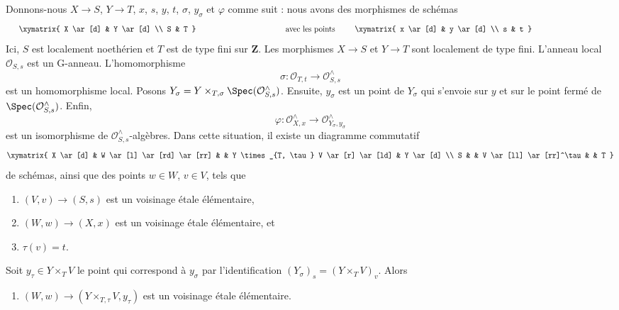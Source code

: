 \begin{lemma}
\label{lemma-relative-map-approximation-pre}
Donnons-nous $X \to S$, $Y \to T$, $x$, $s$, $y$, $t$, $\sigma$, $y_\sigma$ et
$\varphi$ comme suit : nous avons des morphismes de schémas
$$
\vcenter{
\xymatrix{
X \ar[d] & Y \ar[d] \\
S & T
}
}
\quad\text{avec les points}\quad
\vcenter{
\xymatrix{
x \ar[d] & y \ar[d] \\
s & t
}
}
$$
Ici, $S$ est localement noethérien et $T$ est de type fini sur $\mathbf{Z}$.
Les morphismes $X \to S$ et $Y \to T$ sont localement de type fini.
L'anneau local $\mathcal{O}_{S, s}$ est un G-anneau. L'homomorphisme
$$
\sigma : \mathcal{O}_{T, t} \longrightarrow \mathcal{O}_{S, s}^\wedge
$$
est un homomorphisme local. Posons
$Y_\sigma = Y \times_{T, \sigma} \Spec(\mathcal{O}_{S, s}^\wedge)$.
Ensuite, $y_\sigma$ est un point de $Y_\sigma$ qui s'envoie sur $y$ et sur
le point fermé de $\Spec(\mathcal{O}_{S, s}^\wedge)$. Enfin,
$$
\varphi :
\mathcal{O}_{X, x}^\wedge
\longrightarrow
\mathcal{O}_{Y_\sigma, y_\sigma}^\wedge
$$
est un isomorphisme de $\mathcal{O}_{S, s}^\wedge$-algèbres.
Dans cette situation, il existe un diagramme commutatif
$$
\xymatrix{
X \ar[d] &
W \ar[l] \ar[rd] \ar[rr] & &
Y \times_{T, \tau} V \ar[r] \ar[ld] & Y \ar[d] \\
S & &
V \ar[ll] \ar[rr]^\tau & &
T
}
$$
de schémas, ainsi que des points $w \in W$, $v \in V$, tels que
\begin{enumerate}
\item $(V, v) \to (S, s)$ est un voisinage \'etale élémentaire,
\item $(W, w) \to (X, x)$ est un voisinage \'etale élémentaire, et
\item $\tau(v) = t$.
\end{enumerate}
Soit $y_\tau \in Y \times_T V$ le point qui correspond à $y_\sigma$
par l'identification $(Y_\sigma)_s = (Y \times_T V)_v$.
Alors
\begin{enumerate}
\item[(4)] $(W, w) \to (Y \times_{T, \tau} V, y_\tau)$ est un voisinage
\'etale élémentaire.
\end{enumerate}
\end{lemma}

